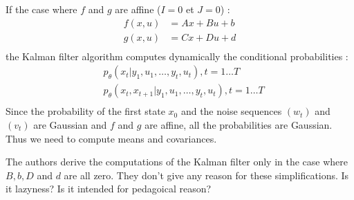 If the case where $f$ and $g$ are affine ($I=0$ et $J=0$) :
\begin{align*}
  f(x,u) &= Ax + Bu + b\\
  g(x,u) &= Cx + Du + d\\
\end{align*}
the Kalman filter algorithm computes dynamically the conditional probabilities :
\begin{align*}
  &p_{\theta}\left(x_t|y_1, u_1, \ldots, y_t, u_t \right ), t=1 \ldots T\\
  &p_{\theta}\left(x_t, x_{t+1}|y_1, u_1, \ldots, y_t, u_t \right ), t=1 \ldots T\\
\end{align*}
Since the probability of the first state $x_0$ and the noise sequences $(w_t)$ and $(v_t)$ are Gaussian and $f$ and $g$ are affine, all the probabilities are Gaussian.
Thus we need to compute means and covariances.

The authors derive the computations of the Kalman filter only in the case where $B,b,D$ and $d$ are all zero.
They don't give any reason for these simplifications.
Is it lazyness?
Is it intended for pedagoical reason?

